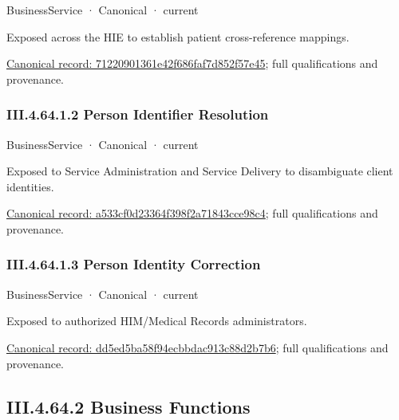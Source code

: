 \label{element:71220901361e42f686faf7d852f57e45}
{\small BusinessService · Canonical · current}\par

Exposed across the HIE to establish patient cross-reference mappings.


{\footnotesize \href{../../../../continuum/business/business-service/71220901361e42f686faf7d852f57e45.md}{Canonical record: 71220901361e42f686faf7d852f57e45}; full qualifications and provenance.}\par
\subsubsection*{III.4.64.1.2 Person Identifier Resolution}
\label{navigation:III.4.64.1.2}

\label{element:a533cf0d23364f398f2a71843cce98c4}
{\small BusinessService · Canonical · current}\par

Exposed to Service Administration and Service Delivery to disambiguate client identities.


{\footnotesize \href{../../../../continuum/business/business-service/a533cf0d23364f398f2a71843cce98c4.md}{Canonical record: a533cf0d23364f398f2a71843cce98c4}; full qualifications and provenance.}\par
\subsubsection*{III.4.64.1.3 Person Identity Correction}
\label{navigation:III.4.64.1.3}

\label{element:dd5ed5ba58f94ecbbdac913c88d2b7b6}
{\small BusinessService · Canonical · current}\par

Exposed to authorized HIM/Medical Records administrators.


{\footnotesize \href{../../../../continuum/business/business-service/dd5ed5ba58f94ecbbdac913c88d2b7b6.md}{Canonical record: dd5ed5ba58f94ecbbdac913c88d2b7b6}; full qualifications and provenance.}\par
\subsection*{III.4.64.2 Business Functions}
\label{navigation:III.4.64.2}

